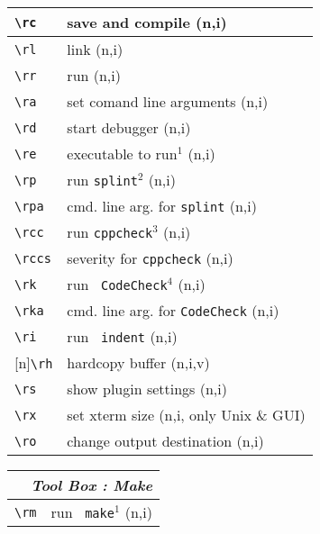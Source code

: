 \documentclass[oneside,11pt,landscape,DIV16]{scrartcl}
\newcommand{\Rep}{{\tiny{[n]}}}
\begin{document}
\begin{multicols}{3}
\begin{center}
\begin{tabular}[]{|p{12mm}|p{58mm}|}
\hline \verb'\rc'  & save and compile                        \hfill (n,i)\\
\hline \verb'\rl'  & link                                    \hfill (n,i)\\
\hline \verb'\rr'  & run                                     \hfill (n,i)\\
\hline \verb'\ra'  & set comand line arguments               \hfill (n,i)\\
\hline \verb'\rd'  & start debugger                          \hfill (n,i)\\
\hline \verb'\re'  & executable to run$^1$                   \hfill (n,i)\\
%
\hline \verb'\rp'  & run \texttt{splint}$^2$                 \hfill (n,i)\\
\hline \verb'\rpa' & cmd. line arg. for \texttt{splint}      \hfill (n,i)\\
%
\hline \verb'\rcc' & run \texttt{cppcheck}$^3$               \hfill (n,i)\\
\hline \verb'\rccs'& severity for \texttt{cppcheck}          \hfill (n,i)\\
%
\hline \verb'\rk'  & run \texttt{ CodeCheck}$^4$             \hfill (n,i)\\
\hline \verb'\rka' & cmd. line arg. for \texttt{CodeCheck}   \hfill (n,i)\\
%
\hline \verb'\ri'  & run \texttt{ indent}        \hfill (n,i)\\
\hline \Rep\verb'\rh'  & hardcopy buffer         \hfill (n,i,v)\\
\hline \verb'\rs'  & show plugin settings        \hfill (n,i)\\
\hline \verb'\rx'  & set xterm size              \hfill (n,i, only Unix \& GUI)\\
\hline \verb'\ro'  & change output destination   \hfill (n,i)\\
\hline 
\end{tabular}
%
%
\begin{tabular}[]{|p{12mm}|p{58mm}|}
\hline
\multicolumn{2}{|r|}{\textsl{Tool Box : \textbf{M}ake}} \\
\hline \verb'\rm'  & run \texttt{ make}$^1$                  \hfill (n,i)\\

\end{tabular}
\end{center}
\end{multicols}
\end{document}
